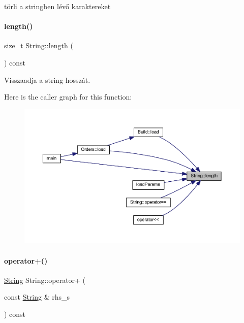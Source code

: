 törli a stringben lévő karaktereket 

\mbox{\label{class_string_ad3b888edbfb3bab21d4bae4663d2211a}} 
\paragraph{\texorpdfstring{length()}{length()}}
{\footnotesize\ttfamily size\+\_\+t String\+::length (\begin{DoxyParamCaption}{ }\end{DoxyParamCaption}) const\hspace{0.3cm}{\ttfamily [inline]}}



Visszaadja a string hosszát. 

Here is the caller graph for this function\+:
\nopagebreak
\begin{figure}[H]
\begin{center}
\leavevmode
\includegraphics[width=350pt]{class_string_ad3b888edbfb3bab21d4bae4663d2211a_icgraph}
\end{center}
\end{figure}
\mbox{\label{class_string_a28a020f061e5f25317af47488bfb7de8}} 
\paragraph{\texorpdfstring{operator+()}{operator+()}\hspace{0.1cm}{\footnotesize\ttfamily [1/2]}}
{\footnotesize\ttfamily \mbox{\hyperlink{class_string}{String}} String\+::operator+ (\begin{DoxyParamCaption}\item[{const \mbox{\hyperlink{class_string}{String}} \&}]{rhs\+\_\+s }\end{DoxyParamCaption}) const}



